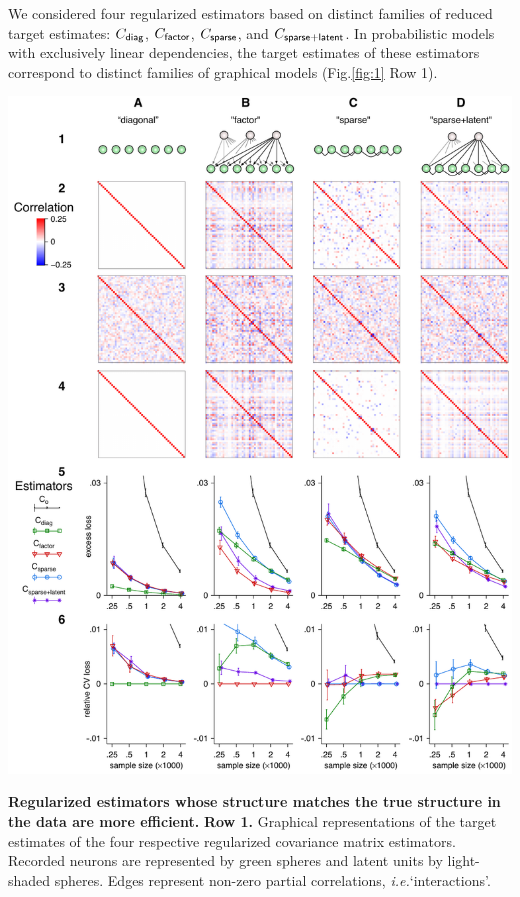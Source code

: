 \documentclass[10pt]{article}
\newcommand{\sq}[1]{\lq#1\rq}
\newcommand{\figref}[2]{Fig.\;\ref{fig:#1}\,#2}
\newcommand{\ie}{\emph{i.e.}\;}
\begin{document}
We considered four regularized estimators based on distinct families of reduced target estimates: $C_{\sf diag}$, $C_{\sf factor}$, $C_{\sf sparse}$, and $C_{\sf sparse+latent}$. In probabilistic models with exclusively linear dependencies, the target estimates of these estimators correspond to distinct families of graphical models (\figref{1}{\,Row 1}).  

\begin{FPfigure}
    \begin{center}
        \includegraphics{./figures/Figure01.pdf}
    \end{center}
    \caption{{\bf Regularized estimators whose structure matches the true structure in the data are more efficient.}
    {\bf Row 1.} Graphical representations of the target estimates of the four respective regularized covariance matrix estimators.  Recorded neurons are represented by green spheres and latent units by light-shaded spheres.  Edges represent non-zero partial correlations, \ie \sq{interactions}.
}
\end{FPfigure}
\end{document}
